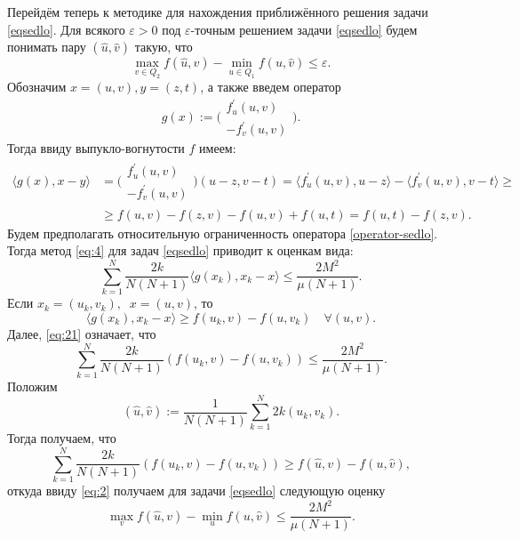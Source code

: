     Перейдём теперь к методике для нахождения приближённого решения задачи \eqref{eqsedlo}. Для всякого $\varepsilon > 0$ под $\varepsilon$-точным решением задачи \eqref{eqsedlo} будем понимать пару $(\widehat{u}, \widehat{v})$ такую, что $$\max_{v \in Q_2} f(\widehat{u}, v) - \min_{u \in Q_1} f(u, \widehat{v}) \leq \varepsilon.$$ Обозначим $x = (u, v), y = (z, t)$, а также введем оператор 
    \begin{equation}\label{operator-sedlo}
        g(x) := \Bigg( 
        \begin{aligned}
            f^{'}_{u}(u,v)\\
            -f^{'}_{v}(u,v)
        \end{aligned}
        \Bigg).
    \end{equation}
    Тогда ввиду выпукло-вогнутости $f$ имеем: 
    \begin{equation}
    \begin{aligned}
        \langle g(x), x - y \rangle &=
         \Bigg( 
        \begin{aligned}
            f^{'}_{u}(u,v)\\
            -f^{'}_{v}(u,v)
        \end{aligned}
        \Bigg)
         (u - z, v - t)  = \langle f^{'}_{u}(u,v), u - z \rangle - \langle f^{'}_{v}(u,v), v - t \rangle \geq \\&
         \geq f(u, v) - f(z, v) 
        - f(u, v)+ f(u, t)=  f(u,t) - f(z, v).
    \end{aligned}
    \end{equation}
    Будем предполагать относительную ограниченность оператора \eqref{operator-sedlo}. Тогда метод \eqref{eq:4} для задач \eqref{eqsedlo} приводит к оценкам вида:
    \begin{equation} \label{eq:21}
        \sum_{k=1}^{N} \frac{2k}{N(N+1)} \langle g(x_k), x_k -x\rangle \leq \frac{2 M^2}{\mu (N+1)}.
    \end{equation}
    Если $x_k = (u_k, v_k), \;\; x = (u, v)$, то  
    \begin{equation}
        \langle g(x_k), x_k -x\rangle \geq f(u_k,v) - f(u, v_k) \quad \forall (u, v).
    \end{equation}
    Далее, \eqref{eq:21} означает, что 
    \begin{equation}
        \sum_{k=1}^{N} \frac{2k}{N(N+1)} (f(u_k,v) - f(u, v_k)) \leq \frac{2M^2}{\mu (N+1)}.
    \end{equation}
    Положим
    \begin{equation}
        (\widehat{u}, \widehat{v}) := \frac{1}{N(N+1)} \sum_{k=1}^{N} 2k (u_k,v_k).
    \end{equation}
    Тогда получаем, что
    \begin{equation}
        \sum_{k=1}^{N} \frac{2k}{N(N+1)} (f(u_k, v) - f(u, v_k)) \geq f(\widehat{u}, v) - f(u, \widehat{v}), 
    \end{equation}
    откуда ввиду \eqref{eq:2} получаем для задачи \eqref{eqsedlo} следующую оценку
    \begin{equation}
        \max_{v} f(\widehat{u}, v) - \min_{u} f(u, \widehat{v}) \leq \frac{2M^2}{\mu (N+1)}.
    \end{equation}

